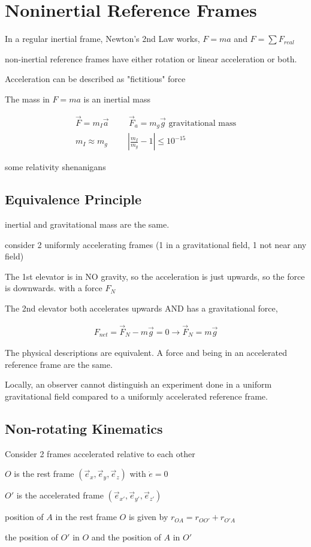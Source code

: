 \documentclass[fleqn]{report}
\newcommand{\hp}{\hspace{1cm}}
\newcommand{\equations} [1] {
\begin{gather*}
#1
\end{gather*}
}
\begin{document}
\chapter{Noninertial Reference Frames}
In a regular inertial frame, Newton's 2nd Law works,
$F = ma$ and $F = \sum F_{real}$

non-inertial reference frames have either rotation or linear 
acceleration or both. 

Acceleration can be described as "fictitious" force

The mass in $F = ma$ is an inertial mass 
\equations{
    \vec F = m_I \vec a
    \hp 
    \vec F_a = m_g \vec g \textrm{ gravitational mass}
    \\
    m_I \approx m_g \hp |\frac{m_I}{m_g} - 1| \leq 10^{-15}
}
some relativity shenanigans

\section{Equivalence Principle}
inertial and gravitational mass are the same. 

consider 2 uniformly accelerating frames 
(1 in a gravitational field, 1 not near any field)

The 1st elevator is in NO gravity, so the acceleration is just 
upwards, so the force is downwards. with a force $F_N$

The 2nd elevator both accelerates upwards AND has a gravitational 
force, 
\equations{
    F_{net} = \vec F_N - m \vec g = 0 
    \rightarrow 
    \vec F_N = m \vec g
}
The physical descriptions are equivalent. A force and being in 
an accelerated reference frame are the same. 

Locally, an observer cannot distinguish an experiment done 
in a uniform gravitational field compared to a uniformly 
accelerated reference frame. 

\section{Non-rotating Kinematics}
Consider 2 frames accelerated relative to each other 

$O$ is the rest frame $(\vec e_x, \vec e_y, \vec e_z)$ with $\dot e = 0$

$O'$ is the accelerated frame $(\vec e_{x'}, \vec e_{y'}, \vec e_{z'})$

position of $A$ in the rest frame $O$ is given by 
$r_{OA} = r_{OO'} + r_{O' A}$

the position of $O'$ in $O$ and the position of $A$ in $O'$
\end{document}
